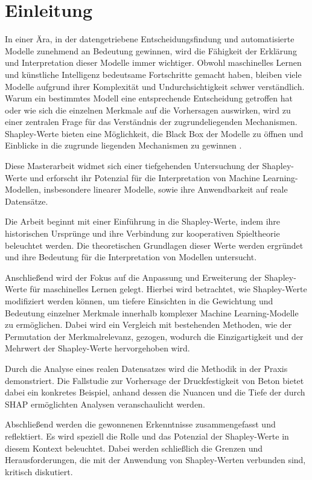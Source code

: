 \chapter{Einleitung}

In einer Ära, in der datengetriebene Entscheidungsfindung und automatisierte Modelle zunehmend an Bedeutung gewinnen,
wird die Fähigkeit der Erklärung und Interpretation dieser Modelle immer wichtiger. Obwohl maschinelles Lernen und
künstliche Intelligenz bedeutsame Fortschritte gemacht haben, bleiben viele Modelle aufgrund ihrer Komplexität und Undurchsichtigkeit
schwer verständlich. Warum ein bestimmtes Modell eine entsprechende Entscheidung getroffen hat oder wie sich die einzelnen
Merkmale auf die Vorhersagen auswirken, wird zu einer zentralen Frage für das Verständnis der zugrundeliegenden Mechanismen. 
Shapley-Werte bieten eine Möglichkeit, die \glqq{}Black Box\grqq{} der Modelle zu öffnen und Einblicke 
in die zugrunde liegenden Mechanismen zu gewinnen \cite[S. 3]{Molnar_2023}. 

Diese Masterarbeit widmet sich einer tiefgehenden Untersuchung der Shapley-Werte und erforscht ihr Potenzial für die Interpretation
von Machine Learning-Modellen, insbesondere linearer Modelle, sowie ihre Anwendbarkeit auf reale Datensätze.

Die Arbeit beginnt mit einer Einführung in die Shapley-Werte, indem ihre historischen Ursprünge 
und ihre Verbindung zur kooperativen Spieltheorie beleuchtet werden. Die theoretischen Grundlagen dieser Werte werden 
ergründet und ihre Bedeutung für die Interpretation von Modellen untersucht.

Anschließend wird der Fokus auf die Anpassung und Erweiterung der Shapley-Werte für maschinelles Lernen gelegt. 
Hierbei wird betrachtet, wie Shapley-Werte modifiziert werden können, um tiefere Einsichten in die Gewichtung 
und Bedeutung einzelner Merkmale innerhalb komplexer Machine Learning-Modelle zu ermöglichen. Dabei wird ein Vergleich 
mit bestehenden Methoden, wie der Permutation der Merkmalrelevanz, gezogen, wodurch die Einzigartigkeit und der Mehrwert der 
Shapley-Werte hervorgehoben wird.

Durch die Analyse eines realen Datensatzes wird die Methodik in der Praxis demonstriert. Die Fallstudie zur Vorhersage der 
Druckfestigkeit von Beton bietet dabei ein konkretes Beispiel, anhand dessen die Nuancen und die Tiefe der durch SHAP 
ermöglichten Analysen veranschaulicht werden.

Abschließend werden die gewonnenen Erkenntnisse zusammengefasst und reflektiert. Es wird speziell die Rolle und das 
Potenzial der Shapley-Werte in diesem Kontext beleuchtet. Dabei werden schließlich die Grenzen und Herausforderungen, 
die mit der Anwendung von Shapley-Werten verbunden sind, kritisch diskutiert. 